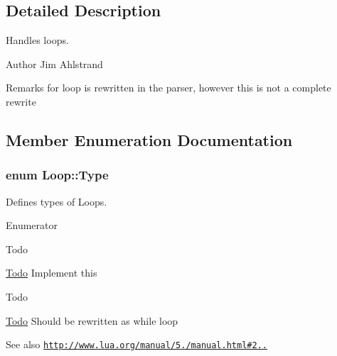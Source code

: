 \subsection{Detailed Description}
Handles loops. 

\begin{DoxyAuthor}{Author}
Jim Ahlstrand 
\end{DoxyAuthor}
\begin{DoxyRemark}{Remarks}
for loop is rewritten in the parser, however this is not a complete rewrite 
\end{DoxyRemark}


\subsection{Member Enumeration Documentation}
\hypertarget{classLoop_af57e9c094063c514758dfe7bd986d6e7}{}
\subsubsection[{Type}]{\setlength{\rightskip}{0pt plus 5cm}enum {\bf Loop\+::\+Type}}\label{classLoop_af57e9c094063c514758dfe7bd986d6e7}


Defines types of Loops. 

\begin{Desc}
\item[Enumerator]\par
\begin{description}
\item[{\em 
\hypertarget{classLoop_af57e9c094063c514758dfe7bd986d6e7a681be1f5a1ab60d13010c6df3358088e}{}While\label{classLoop_af57e9c094063c514758dfe7bd986d6e7a681be1f5a1ab60d13010c6df3358088e}
}]\begin{DoxyRefDesc}{Todo}
\item[\hyperlink{todo__todo000002}{Todo}]Implement this \end{DoxyRefDesc}
\item[{\em 
\hypertarget{classLoop_af57e9c094063c514758dfe7bd986d6e7a7637227f2d51adc47dea05b5fe6802ac}{}For\label{classLoop_af57e9c094063c514758dfe7bd986d6e7a7637227f2d51adc47dea05b5fe6802ac}
}]\begin{DoxyRefDesc}{Todo}
\item[\hyperlink{todo__todo000003}{Todo}]Should be rewritten as while loop \begin{DoxySeeAlso}{See also}
\href{http://www.lua.org/manual/5.1/manual.html#2.4.5}{\tt http\+://www.\+lua.\+org/manual/5./manual.\+html\#2..} 
\end{DoxySeeAlso}
\end{DoxyRefDesc}
\end{description}
\end{Desc}


